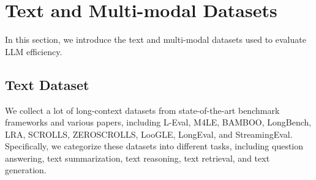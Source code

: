 \section{Text and Multi-modal Datasets}\label{sec:dataset}


In this section, we introduce the text and multi-modal datasets used to evaluate LLM efficiency.

\subsection{Text Dataset}\label{ssec:text_dataset}


We collect a lot of long-context datasets from state-of-the-art benchmark frameworks and various papers, including L-Eval\cite{an_l-eval:_2023}, M4LE\cite{kwan_m4le:_2023}, BAMBOO\cite{dong2023bamboo}, LongBench\cite{bai_longbench:_2023}, LRA\cite{tay_long_lra_2020}, SCROLLS\cite{shaham_scrolls:_2022}, ZEROSCROLLS\cite{shaham_zeroscrolls:_2023}, LooGLE\cite{li_loogle:_2023}, LongEval\cite{longchat2023}, and StreamingEval\cite{DBLP:conf/iclr/XiaoTCHL24}.
Specifically,
we categorize these datasets into different tasks, including question answering, text summarization, text reasoning, text retrieval, and text generation.


